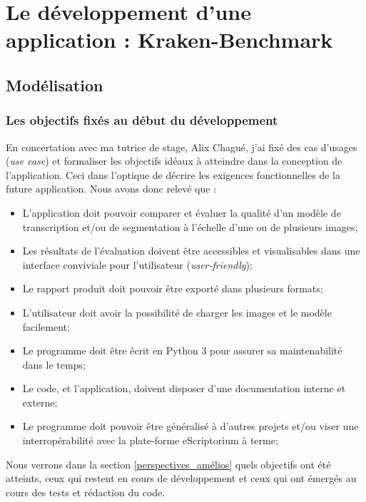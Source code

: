 \clearpage
\thispagestyle{empty}
\chapter{Le développement d'une application : Kraken-Benchmark}

\section{Modélisation}

\subsection{Les objectifs fixés au début du développement}\label{objectifs}
En concertation avec ma tutrice de stage, Alix Chagué, j'ai fixé des cas d'usages (\textit{use case}) et formaliser les objectifs idéaux à atteindre dans la conception de l'application. Ceci dans l'optique de  décrire les exigences fonctionnelles de la future application. Nous avons donc relevé que :

\begin{itemize}
    \item L'application doit pouvoir comparer et évaluer la qualité d'un modèle de transcription et/ou de segmentation à l'échelle d'une ou de plusieurs images;
    \item Les résultats de l'évaluation doivent être accessibles et visualisables dans une interface conviviale pour l'utilisateur (\textit{user-friendly});
    \item Le rapport produit doit pouvoir être exporté dans plusieurs formats;
    \item L'utilisateur doit avoir la possibilité de charger les images et le modèle facilement;
    \item Le programme doit être écrit en Python 3 pour assurer sa  maintenabilité dans le temps;
    \item Le code, et l'application, doivent disposer d'une documentation interne et externe;
    \item Le programme doit pouvoir être généralisé à d'autres projets et/ou viser une interropérabilité avec la plate-forme eScriptorium à terme;
\end{itemize}

Nous verrons dans la section \ref{perspectives_amélios} quels objectifs ont été atteints, ceux qui restent en cours de développement et ceux qui ont émergés au cours des tests et rédaction du code. 

